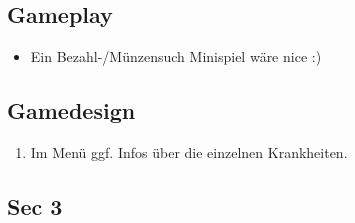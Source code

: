 ﻿\documentclass[a4paper, 11pt]{scrartcl}
\begin{document}
\subsection{Gameplay}
\begin{itemize}
    \item Ein Bezahl-/Münzensuch Minispiel wäre nice :)
\end{itemize}


\subsection{Gamedesign}
\begin{enumerate}
    \item Im Menü ggf. Infos über die einzelnen Krankheiten.
\end{enumerate}

\subsection{Sec 3}
\end{document}
